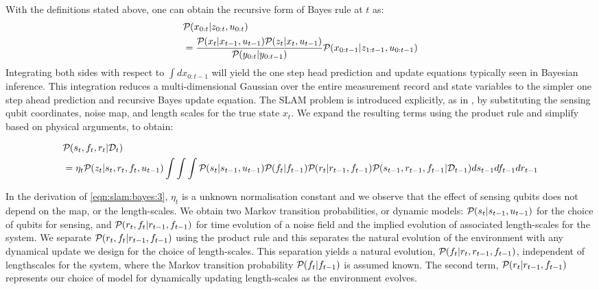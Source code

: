 \\
With the definitions stated above, one can obtain the recursive form of Bayes rule at $t$ as:
\begin{align}
&\mathcal{P}_{} ( x_{0:t} | z_{0:t}, u_{0:t} ) \nonumber \\ 
& = \frac{\mathcal{P}_{} ( x_{t}| x_{t-1}, u_{t-1}  ) \mathcal{P}_{} ( z_{t}| x_{t}, u_{t-1}  )}{\mathcal{P}_{} ( y_{0:t} | y_{0:t-1} )}\mathcal{P}_{} ( x_{0:t-1} | z_{1:t-1}, u_{0:t-1} ) \label{eqn:slam:bayes:2}
\end{align} Integrating both sides with respect to $\int dx_{0:t-1}$ will yield the one step head prediction and update equations typically seen in Bayesian inference. This integration reduces a multi-dimensional Gaussian over the entire measurement record and state variables to the simpler one step ahead prediction and recursive Bayes update equation.
The SLAM problem is introduced explicitly, as in \cite{thrun2001probabilistic}, by substituting the sensing qubit coordinates, noise map, and length scales for the true state $x_t$.	We expand the resulting terms  using the product rule and simplify based on physical arguments, to obtain: 
 \begin{widetext}
  	\begin{align}
  	&\mathcal{P}_{} ( s_t, f_{ t}, r_t | \mathcal{D}_t ) \nonumber \\
  	& = \eta_t\mathcal{P}_{} ( z_t | s_t, r_t, f_{ t}, u_{t-1} ) \int \int \int \mathcal{P}_{} (  s_t| s_{t-1}, u_{t-1} )  \mathcal{P}_{} (  f_{ t}|  f_{ t-1} ) \mathcal{P}_{} (  r_t|  r_{t-1}, f_{ t-1} ) \mathcal{P}_{} ( s_{t-1}, r_{t-1}, f_{ t-1}| \mathcal{D}_{t-1} )  ds_{t-1} df_{ t-1} dr_{t-1}   \label{eqn:slam:bayes:3} 
  	\end{align} 
  \end{widetext} In the derivation of \cref{eqn:slam:bayes:3}, $\eta_t$ is a unknown normalisation constant and we observe that the effect of sensing qubits does not depend on the map, or the length-scales.  We obtain two Markov transition probabilities, or dynamic models:  $\mathcal{P}_{} (  s_t| s_{t-1}, u_{t-1} )$ for the choice of qubits for sensing, and $\mathcal{P}_{} (  r_t, f_{ t}|  r_{t-1}, f_{ t-1} )$ for time evolution of a noise field and the implied evolution of associated length-scales for the system. We separate $\mathcal{P}_{} (  r_t, f_{ t}|  r_{t-1}, f_{ t-1} )$ using the product rule and this separates the natural evolution of the environment with any dynamical update we design for the choice of length-scales. This separation yields a natural evolution, $\mathcal{P}_{} (   f_{ t}|  r_t, r_{t-1}, f_{ t-1} ) $,  independent of lengthscales for the system, where the Markov transition probability $\mathcal{P}_{} (  f_{ t}|  f_{ t-1} )$ is assumed known. The second term, $\mathcal{P}_{} (  r_t|  r_{t-1}, f_{ t-1} )$ represents our choice of model for dynamically updating length-scales as the environment evolves.\\
